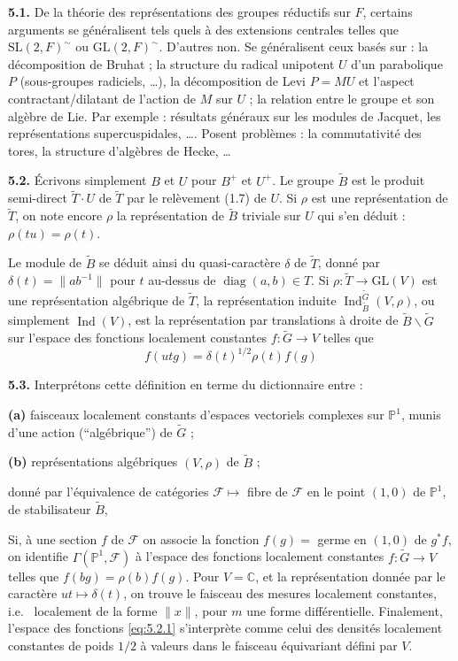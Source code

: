 \documentclass[12pt,a4paper]{article}
\theoremstyle{plain}
\theoremstyle{definition}
\theoremstyle{remark}
\DeclareMathOperator{\Ind}{Ind}
\DeclareMathOperator{\diag}{diag}
\newcommand{\CC}{\mathbb{C}}
\newcommand{\wt}{\widetilde}
\newcommand{\cF}{\mathscr{F}}
\newcommand{\PP}{\mathbb{P}}
\providecommand{\CC}{\mathbb{C}}
\providecommand{\PP}{\mathbb{P}}
\providecommand{\cF}{\mathcal{F}}
\begin{document}
\textbf{5.1.} De la théorie des représentations des groupes réductifs sur $F$, certains arguments se généralisent tels quels à des extensions centrales telles que $\mathrm{SL}(2, F)^\sim$ ou $\mathrm{GL}(2, F)^\sim$. D'autres non. Se généralisent ceux basés sur : la décomposition de Bruhat ; la structure du radical unipotent $U$ d'un parabolique $P$ (sous-groupes radiciels, \ldots), la décomposition de Levi $P = MU$ et l'aspect contractant/dilatant de l'action de $M$ sur $U$ ; la relation entre le groupe et son algèbre de Lie. Par exemple : résultats généraux sur les modules de Jacquet, les représentations supercuspidales, \ldots. Posent problèmes : la commutativité des tores, la structure d'algèbres de Hecke, \ldots

\textbf{5.2.} Écrivons simplement $B$ et $U$ pour $B^+$ et $U^+$. Le groupe $\wt{B}$ est le produit semi-direct $\wt{T} \cdot U$ de $\wt{T}$ par le relèvement (1.7) de $U$. Si $\rho$ est une représentation de $\wt{T}$, on note encore $\rho$ la représentation de $\wt{B}$ triviale sur $U$ qui s'en déduit : $\rho(tu) = \rho(t)$.

Le module de $\wt{B}$ se déduit ainsi du quasi-caractère $\delta$ de $\wt{T}$, donné par $\delta(t) = \|ab^{-1}\|$ pour $t$ au-dessus de $\diag(a, b) \in T$. Si $\rho : \wt{T} \to \mathrm{GL}(V)$ est une représentation algébrique de $\wt{T}$, la représentation induite $\Ind_{\wt{B}}^{\wt{G}}(V, \rho)$, ou simplement $\Ind(V)$, est la représentation par translations à droite de $\wt{B} \backslash \wt{G}$ sur l'espace des fonctions localement constantes $f : \wt{G} \to V$ telles que
\begin{equation}\label{eq:5.2.1}
f(utg) = \delta(t)^{1/2} \rho(t) f(g)
\tag{5.2.1}
\end{equation}

\textbf{5.3.} Interprétons cette définition en terme du dictionnaire entre :

\textbf{(a)} faisceaux localement constants d'espaces vectoriels complexes sur $\PP^1$, munis d'une action (``algébrique'') de $\wt{G}$ ;

\textbf{(b)} représentations algébriques $(V, \rho)$ de $\wt{B}$ ;

donné par l'équivalence de catégories $\cF \mapsto$ fibre de $\cF$ en le point $(1, 0)$ de $\PP^1$, de stabilisateur $\wt{B}$,

Si, à une section $f$ de $\cF$ on associe la fonction $f(g) =$ germe en $(1, 0)$ de $g^*f$, on identifie $\Gamma(\PP^1, \cF)$ à l'espace des fonctions localement constantes $f : \wt{G} \to V$ telles que $f(bg) = \rho(b) f(g)$. Pour $V = \CC$, et la représentation donnée par le caractère $ut \mapsto \delta(t)$, on trouve le faisceau des mesures localement constantes, i.e.
\ localement de la forme $\|x\|$, pour $m$ une forme différentielle. Finalement, l'espace des fonctions \eqref{eq:5.2.1} s'interprète comme celui des densités localement constantes de poids $1/2$ à valeurs dans le faisceau équivariant défini par $V$.
\end{document}
